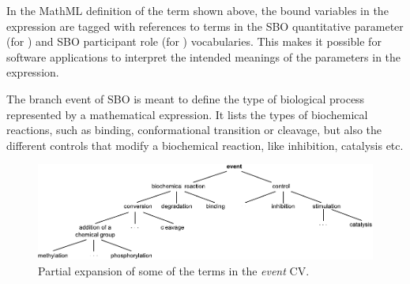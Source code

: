 In the MathML definition of the term shown above, the bound
variables in the  expression are tagged with
references to terms in the SBO quantitative parameter (for
) and SBO participant role (for ) vocabularies.
This makes it possible for software applications to interpret the
intended meanings of the parameters in the expression.

The branch event of SBO is meant to define the type of biological process represented by a mathematical expression. It lists the types of biochemical reactions, such as binding, conformational transition or cleavage, but also the different controls that modify a biochemical reaction, like inhibition, catalysis etc.

\begin{figure}[tbh]
  \centering
  \includegraphics[scale = 0.97]{figs/sbo-event}
  \caption{Partial expansion of some of the terms in the \emph{event} CV.}
  \label{fig:sbo-event}
\end{figure}





